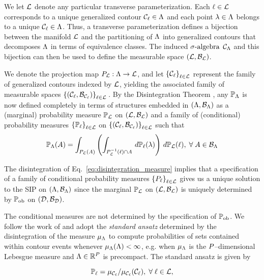 We let $\mathcal{L}$ denote any particular transverse parameterization.
Each $\ell\in\mathcal{L}$ corresponds to a unique generalized contour $\mathcal{C}_\ell \in {\Lambda}$ and each point $\lambda\in{\Lambda}$ belongs to a unique $\mathcal{C}_\ell\in{\Lambda}$.
Thus, a transverse parameterization defines a bijection between the manifold $\mathcal{L}$ and the partitioning of ${\Lambda}$ into generalized contours that decomposes ${\Lambda}$ in terms of equivalence classes.
The induced $\sigma\text{-algebra}$ $\mathcal{C}_{{\Lambda}}$ and this bijection can then be used to define the measurable space $(\mathcal{L}, \mathcal{B}_{\mathcal{L}})$.

We denote the projection map $P_{\mathcal{L}} : {\Lambda} \to \mathcal{L}$, and let $\left\{\mathcal{C}_\ell\right\}_{\ell\in\mathcal{L}}$ represent the family of generalized contours indexed by $\mathcal{L}$, yielding the associated family of measurable spaces $\left\{\left ( \mathcal{C}_\ell, \mathcal{B}_{\mathcal{C}_\ell} \right )\right\}_{\ell\in\mathcal{L}}{}$.
By the Disintegration Theorem \citep{BES12, Dellacherie_Meyer_book}, any $\mathbb{P}_{\Lambda}$ is now defined completely in terms of structures embedded in $({\Lambda}, \mathcal{B}_{{\Lambda}})$ as a (marginal) probability measure $\mathbb{P}_{\mathcal{L}}$ on $(\mathcal{L}, \mathcal{B}_{\mathcal{L}})$ and a family of (conditional) probability measures $\left\{\mathbb{P}_\ell\right\}_{\ell\in\mathcal{L}}$ on $\left\{\left ( \mathcal{C}_\ell, \mathcal{B}_{\mathcal{C}_\ell} \right )\right\}_{\ell\in\mathcal{L}}$ such that
\begin{equation}\label{eq:disintegration_measure}
\mathbb{P}_{\Lambda} (A) = \int_{P_{\mathcal{L}}(A)} \left ( \int_{P_{\mathcal{L}}^{-1} (\ell) \cap A}\, d\mathbb{P}_\ell(\lambda) \right )\, d\mathbb{P}_{\mathcal{L}} (\ell), \; \forall \; A \in \mathcal{B}_{{\Lambda}}
\end{equation}

\noindent The disintegration of Eq.~\eqref{eq:disintegration_measure} implies that a specification of a family of conditional probability measures $\left\{P_\ell\right\}_{\ell\in\mathcal{L}}$ gives us a unique solution to the SIP on ${({\Lambda}, \mathcal{B}_{{\Lambda}})}$ since the marginal $\mathbb{P}_{\mathcal{L}}$ on ${(\mathcal{L}, \mathcal{B}_{\mathcal{L}})}$ is uniquely determined by $\operatorname*{\mathbb{P}_{ob}}$ on ${(\mathcal{D}, \mathcal{B}_{\mathcal{D}})}$.

The conditional measures are not determined by the specification of $\operatorname*{\mathbb{P}_{ob}}$.
We follow the work of \cite{BET+14} and adopt the \emph{standard ansatz} determined by the disintegration of the measure $\mu_{{\Lambda}}$ to compute probabilities of sets contained within contour events whenever $\mu_{{\Lambda}}({\Lambda}) < \infty$, e.g. when $\mu_{{\Lambda}}$ is the $P$--dimensional Lebesgue measure and ${\Lambda} \in \mathbb{R}^P$ is precompact.
The standard ansatz is given by

\begin{equation}\label{eq:standard_ansatz}
\mathbb{P}_\ell = \mu_{\mathcal{C}_\ell} / \mu_{\mathcal{C}_\ell}(\mathcal{C}_\ell), \; \forall \; \ell \in \mathcal{L},
\end{equation}

